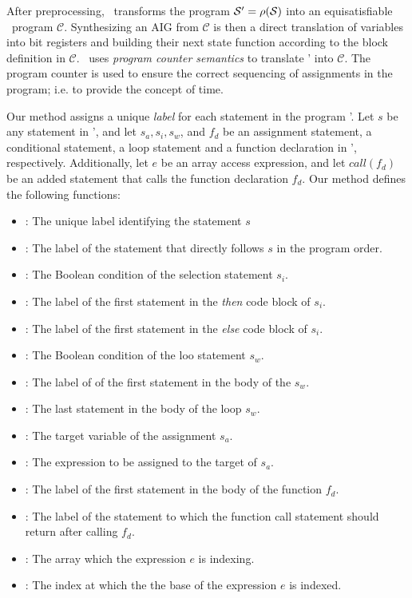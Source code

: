 After preprocessing, \mytool~transforms the program $\mathcal{S}' = \rho(\mathcal{S})$ into 
an equisatisfiable \thislanguage~program $\mathcal{C}$. Synthesizing 
an AIG from $\mathcal{C}$ is then a direct translation of variables into bit registers
and building their next state function according to the  block
definition in $\mathcal{C}$. 
\mytool~uses {\em program counter semantics} to translate \Pm'
into $\mathcal{C}$. The program counter is used to ensure the
correct sequencing of assignments in the program; i.e. to provide the concept of time.

Our method assigns a unique {\em label} for each statement in the
program \Pm'. Let $s$ be any statement in \Pm', 
and let $s_a, s_i, s_w$, and $f_d$ be an assignment statement, 
a conditional statement, a loop statement and a function declaration
in \Pm', respectively. Additionally, let $e$ be an array access expression,
and let $call(f_d)$ be an added  statement
that calls the function declaration $f_d$. 
Our method defines the following functions:
\begin{itemize}
 \item {}: The unique label identifying the statement $s$
 \item {}: The label of the statement that directly follows $s$ in the program order.
 \item {}: The Boolean condition of the selection statement $s_i$.
 \item {}: The label of the first statement in the {\em then} 
 code block of $s_i$.
 \item {}: The label of the first statement in the {\em else}
 code block of $s_i$.
 \item {}: The Boolean condition of the loo statement $s_w$.
 \item {}: The label of of the first statement in the body of the $s_w$.
 \item {}: The last statement in the body of the loop $s_w$.
 \item {}: The target variable of the assignment $s_a$.
 \item {}: The expression to be assigned to the target of $s_a$.
 \item {}: The label of the first statement in the body of the 
 function $f_d$.
 \item {}: The label of the statement to which the function call 
 statement should return after calling $f_d$.
 \item {}: The array which the expression $e$ is indexing.
 \item {}: The index at which the the base of the expression $e$ is indexed.
\end{itemize}


